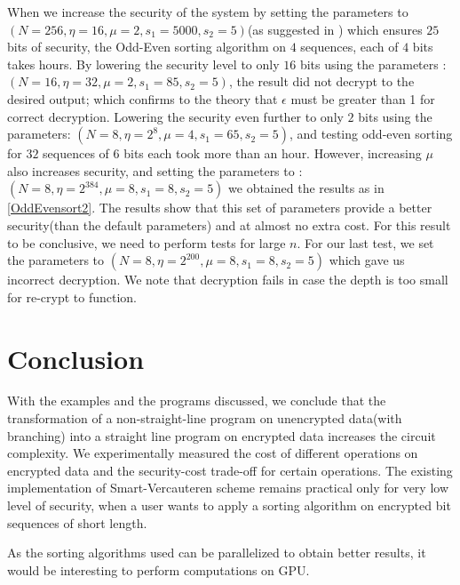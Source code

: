 \documentclass{acm_proc_article-sp}
\begin{document}
When we increase the security of the system by setting the parameters to  $(N = 256,\eta  = 16, \mu = 2, s_1 = 5000, s_2 = 5)$(as suggested in \cite{cryptoeprint:2009:571}) which ensures $25$ bits of security, the Odd-Even sorting algorithm on  $4$ sequences, each of $4$ bits takes hours. By lowering the security level to only $16$ bits using the parameters :$(N = 16, \eta = 32, \mu = 2, s_1 = 85, s_2 = 5)$, the result did not decrypt to the desired output; which confirms to the theory that $\epsilon$ must be greater than 1 for correct decryption. Lowering the security even further to only $2$ bits using the parameters: $(N = 8, \eta = 2^8, \mu = 4, s_1 = 65, s_2 = 5)$, and testing odd-even sorting for $32$ sequences of $6$ bits each took more than an hour. However, increasing $\mu$ also increases security, and setting the parameters to :  $(N = 8, \eta = 2^{384}, \mu = 8, s_1 = 8, s_2 = 5)$ we obtained the results as in \autoref{OddEvensort2}. The results show that this set of parameters provide a better security(than the default parameters) and at almost no extra cost. For this result to be conclusive, we need to perform tests for large $n$. For our last test, we set the parameters to  $(N = 8, \eta = 2^{200}, \mu = 8, s_1 = 8, s_2 = 5)$ which gave us incorrect decryption. We note that decryption fails in case the depth is too small for re-crypt to function.

\section{Conclusion}
With the examples and the programs discussed, we conclude that the transformation of a non-straight-line program on unencrypted data(with branching) into a straight line program on encrypted data increases the circuit complexity. We experimentally measured the cost of different operations on encrypted data and the security-cost trade-off for certain operations. The existing implementation of Smart-Vercauteren scheme remains practical only for very low level of security, when a user wants to apply a sorting algorithm on encrypted bit sequences of short length.

As the sorting algorithms used can be parallelized to obtain better results, it would be interesting to perform computations on GPU.        


  
\balancecolumns
\end{document}
